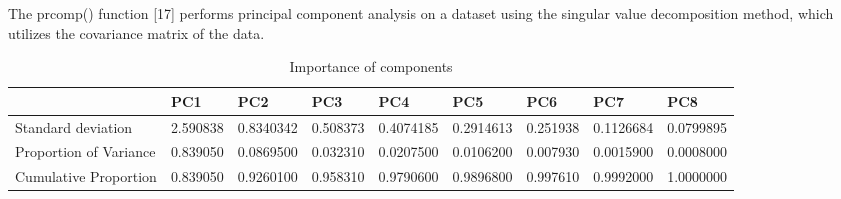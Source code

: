 \documentclass[
  letterpaper,
  DIV=11,
  numbers=noendperiod]{scrreprt}
\newenvironment{Shaded}{\begin{snugshade}}{\end{snugshade}}
\newcommand{\AttributeTok}[1]{\textcolor[rgb]{0.40,0.45,0.13}{#1}}
\newcommand{\CommentTok}[1]{\textcolor[rgb]{0.37,0.37,0.37}{#1}}
\newcommand{\FunctionTok}[1]{\textcolor[rgb]{0.28,0.35,0.67}{#1}}
\newcommand{\NormalTok}[1]{\textcolor[rgb]{0.00,0.23,0.31}{#1}}
\newcommand{\OtherTok}[1]{\textcolor[rgb]{0.00,0.23,0.31}{#1}}
\newcommand{\SpecialCharTok}[1]{\textcolor[rgb]{0.37,0.37,0.37}{#1}}
\newcommand{\StringTok}[1]{\textcolor[rgb]{0.13,0.47,0.30}{#1}}
\begin{document}
The prcomp() function {[}17{]} performs principal component analysis on
a dataset using the singular value decomposition method, which utilizes
the covariance matrix of the data.

\begin{Shaded}
\end{Shaded}

\begin{table}

\caption{Importance of components}
\centering
\begin{tabular}[t]{l|l|l|l|l|l|l|l|l}
\hline
  & PC1 & PC2 & PC3 & PC4 & PC5 & PC6 & PC7 & PC8\\
\hline
Standard deviation & 2.590838 & 0.8340342 & 0.508373 & 0.4074185 & 0.2914613 & 0.251938 & 0.1126684 & 0.0799895\\
\hline
Proportion of Variance & 0.839050 & 0.0869500 & 0.032310 & 0.0207500 & 0.0106200 & 0.007930 & 0.0015900 & 0.0008000\\
\hline
Cumulative Proportion & 0.839050 & 0.9260100 & 0.958310 & 0.9790600 & 0.9896800 & 0.997610 & 0.9992000 & 1.0000000\\
\hline
\end{tabular}
\end{table}
\end{document}
